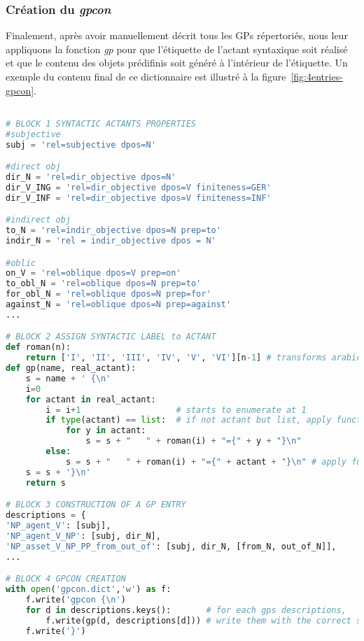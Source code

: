 \subsubsection{Création du \emph{gpcon}}
Finalement, après avoir manuellement décrit tous les \acp{GP} répertoriés, nous leur appliquons la fonction \emph{gp} pour que l'étiquette de l'actant syntaxique soit réalisé et que le contenu des objets prédifinis soit généré à l'intérieur de l'étiquette. Un exemple du contenu final de ce dictionnaire est illustré à la figure~\ref{fig:4entries-gpcon}.

\begin{lstlisting}[language=Python, caption = Création du dictionnaire de patrons de régime]

# BLOCK 1 SYNTACTIC ACTANTS PROPERTIES
#subjective
subj = 'rel=subjective dpos=N'

#direct obj
dir_N = 'rel=dir_objective dpos=N'
dir_V_ING = 'rel=dir_objective dpos=V finiteness=GER'
dir_V_INF = 'rel=dir_objective dpos=V finiteness=INF'

#indirect obj
to_N = 'rel=indir_objective dpos=N prep=to'
indir_N = 'rel = indir_objective dpos = N'

#oblic
on_V = 'rel=oblique dpos=V prep=on'
to_obl_N = 'rel=oblique dpos=N prep=to' 
for_obl_N = 'rel=oblique dpos=N prep=for'
against_N = 'rel=oblique dpos=N prep=against'
...

# BLOCK 2 ASSIGN SYNTACTIC LABEL to ACTANT
def roman(n):
    return ['I', 'II', 'III', 'IV', 'V', 'VI'][n-1] # transforms arabic numbers in roman numbers
def gp(name, real_actant):
    s = name + ' {\n'
    i=0
    for actant in real_actant:
        i = i+1                   # starts to enumerate at 1
        if type(actant) == list:  # if not actant but list, apply function to actants in list
            for y in actant:
                s = s + "   " + roman(i) + "={" + y + "}\n"
        else:
            s = s + "   " + roman(i) + "={" + actant + "}\n" # apply function to actant
    s = s + '}\n'
    return s 

# BLOCK 3 CONSTRUCTION OF A GP ENTRY
descriptions = {
'NP_agent_V': [subj],
'NP_agent_V_NP': [subj, dir_N],
'NP_asset_V_NP_PP_from_out_of': [subj, dir_N, [from_N, out_of_N]],
...

# BLOCK 4 GPCON CREATION
with open('gpcon.dict','w') as f: 
    f.write('gpcon {\n')
    for d in descriptions.keys():       # for each gps descriptions,
        f.write(gp(d, descriptions[d])) # write them with the correct syntactic label
    f.write('}')
\end{lstlisting}
